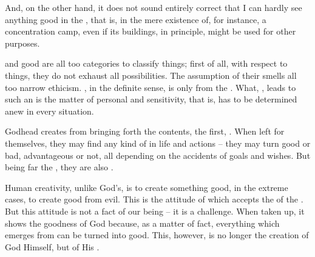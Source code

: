 {{And, on the other hand, it does not sound entirely correct that 
 I can hardly see anything good in the 
, that is, in the mere existence of, for instance, a 
concentration camp, even if its buildings, in principle, might be 
used for other purposes. 

 and good are all too  categories to classify things; 
first of all, with respect to things, they do not exhaust all 
possibilities. The assumption of their  smells all 
too narrow ethicism.  
, in the 
definite sense, is only  from the . What, 
, leads to such an  is the matter of 
personal  and sensitivity, that is, has to be 
determined anew in every  situation.


\say
Godhead creates from  bringing forth the  
contents, the first,  . When left for 
themselves, they may find any kind of  in  
life and actions -- they may turn good or bad, advantageous or not, 
all depending on the accidents of  goals and wishes. 
But being far  the , they are also 
.

Human creativity, unlike God's, is to create something good, in the 
extreme cases, to create good from evil. This is the attitude of 
  which  accepts the 
 of the . But this attitude is not a fact of our 
being -- it is a challenge. When taken up, it shows the goodness of 
God because, as a matter of fact, everything which emerges from 
 can be turned into good. This, however, is no longer 
the creation of God Himself, but of His .


}}
